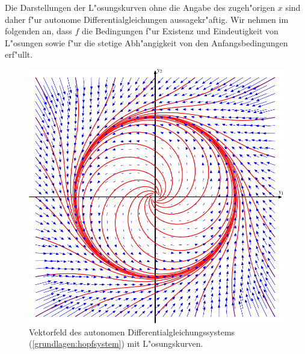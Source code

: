 Die Darstellungen der L"osungskurven ohne die Angabe des
zugeh"origen $x$ sind daher f"ur autonome Differentialgleichungen
 aussagekr"aftig.
Wir nehmen im folgenden an, dass $f$ die Bedingungen f"ur Existenz
und Eindeutigkeit von L"osungen sowie f"ur die stetige Abh"angigkeit
von den Anfangsbedingungen erf"ullt.

\begin{figure}
\centering
\includegraphics{chapters/images/grundlagen-2.pdf}
\caption{Vektorfeld des autonomen Differentialgleichungssystems
(\ref{grundlagen:hopfsystem})
mit L"osungskurven.
\label{grundlagen:vektorfeld}}
\end{figure}%

